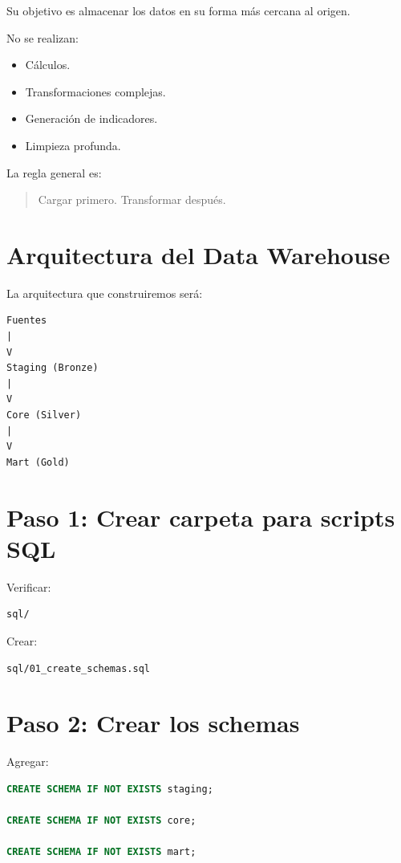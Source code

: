Su objetivo es almacenar los datos en su forma más cercana al origen.

No se realizan:

\begin{itemize}
\item Cálculos.
\item Transformaciones complejas.
\item Generación de indicadores.
\item Limpieza profunda.
\end{itemize}

La regla general es:

\begin{quote}
Cargar primero. Transformar después.
\end{quote}

\section{Arquitectura del Data Warehouse}

La arquitectura que construiremos será:

\begin{verbatim}
Fuentes
|
V
Staging (Bronze)
|
V
Core (Silver)
|
V
Mart (Gold)
\end{verbatim}

\section{Paso 1: Crear carpeta para scripts SQL}

Verificar:

\begin{verbatim}
sql/
\end{verbatim}

Crear:

\begin{verbatim}
sql/01_create_schemas.sql
\end{verbatim}

\section{Paso 2: Crear los schemas}

Agregar:

\begin{lstlisting}[language=SQL]
CREATE SCHEMA IF NOT EXISTS staging;

CREATE SCHEMA IF NOT EXISTS core;

CREATE SCHEMA IF NOT EXISTS mart;
\end{lstlisting}

